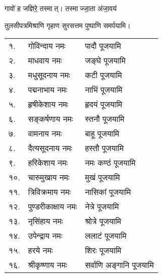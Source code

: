 \begin{center}
{गावो॑ ह जज्ञिरे॒ तस्मात्। तस्माज्जा॒ता अ॑जा॒वय॑}

{तुलसीपत्रमिश्राणि गृहाण सुरसत्तम}
\devAya{} पुष्पाणि समर्पयामि।\\

\begin{longtable}{ll@{—}l}
१. & गोविन्दाय नमः & पादौ पूजयामि \\
२. & माधवाय नमः &  जङ्घे पूजयामि \\
३. & मधुसूदनाय नमः & कटी पूजयामि \\
४. & पद्मनाभाय नमः & नाभिं पूजयामि \\
५. & हृषीकेशाय नमः & हृदयं पूजयामि \\
६. & सङ्कर्षणाय नमः & स्तनौ पूजयामि \\
७. & वामनाय नमः & बाहू पूजयामि \\
८. & दैत्यसूदनाय नमः & हस्तौ पूजयामि \\
९. & हरिकेशाय नमः & नमः कण्ठं पूजयामि \\
१०. & चारुमुखाय नमः & मुखं पूजयामि \\
११. & त्रिविक्रमाय नमः & नासिकां पूजयामि \\
१२. & पुण्डरीकाक्षाय नमः & नेत्रे पूजयामि \\
१३. & नृसिंहाय नमः & श्रोत्रे पूजयामि \\
१४. & उपेन्द्राय नमः & ललाटं पूजयामि \\
१५. & हरये नमः & शिरः पूजयामि \\
१६. & श्रीकृष्णाय नमः & सर्वाणि अङ्गानि पूजयामि \\
\end{longtable}


\end{center}
